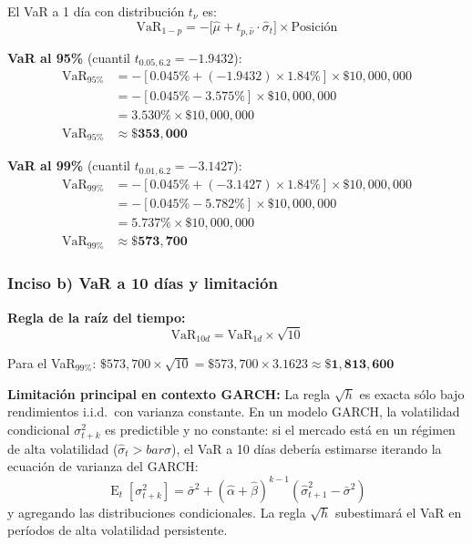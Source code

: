\documentclass[12pt,a4paper]{article}
\DeclareMathOperator{\E}{E}
\begin{document}
\begin{solucion}
El VaR a 1 día con distribución $t_\nu$ es:
\begin{equation}
\text{VaR}_{1-p} = -\bigl[\hat{\mu} + t_{p,\hat{\nu}}\cdot\hat{\sigma}_t\bigr]\times\text{Posición}
\end{equation}

\textbf{VaR al 95\%} (cuantil $t_{0.05,6.2}=-1.9432$):
\begin{align*}
\text{VaR}_{95\%} &= -[0.045\% + (-1.9432)\times 1.84\%]\times\$10{,}000{,}000\\
&= -[0.045\% - 3.575\%]\times\$10{,}000{,}000\\
&= 3.530\%\times\$10{,}000{,}000\\
\text{VaR}_{95\%} &\approx \mathbf{\$353{,}000}
\end{align*}

\textbf{VaR al 99\%} (cuantil $t_{0.01,6.2}=-3.1427$):
\begin{align*}
\text{VaR}_{99\%} &= -[0.045\% + (-3.1427)\times 1.84\%]\times\$10{,}000{,}000\\
&= -[0.045\% - 5.782\%]\times\$10{,}000{,}000\\
&= 5.737\%\times\$10{,}000{,}000\\
\text{VaR}_{99\%} &\approx \mathbf{\$573{,}700}
\end{align*}
\end{solucion}

\subsubsection*{Inciso b) VaR a 10 días y limitación}

\begin{solucion}
\textbf{Regla de la raíz del tiempo:}
\begin{equation}
\text{VaR}_{10d} = \text{VaR}_{1d}\times\sqrt{10}
\end{equation}

Para el VaR$_{99\%}$: $\$573{,}700\times\sqrt{10}=\$573{,}700\times3.1623\approx\mathbf{\$1{,}813{,}600}$

\textbf{Limitación principal en contexto GARCH:} La regla $\sqrt{h}$ es exacta sólo bajo rendimientos i.i.d.\ con varianza constante. En un modelo GARCH, la volatilidad condicional $\sigma_{t+k}^2$ es predictible y no constante: si el mercado está en un régimen de alta volatilidad ($\hat{\sigma}_t>bar{\sigma}$), el VaR a 10 días debería estimarse iterando la ecuación de varianza del GARCH:
\begin{equation}
\E_t[\sigma_{t+k}^2] = \bar{\sigma}^2 + (\hat{\alpha}+\hat{\beta})^{k-1}(\hat{\sigma}_{t+1}^2-\bar{\sigma}^2)
\end{equation}
y agregando las distribuciones condicionales. La regla $\sqrt{h}$ subestimará el VaR en períodos de alta volatilidad persistente.
\end{solucion}
\end{document}
